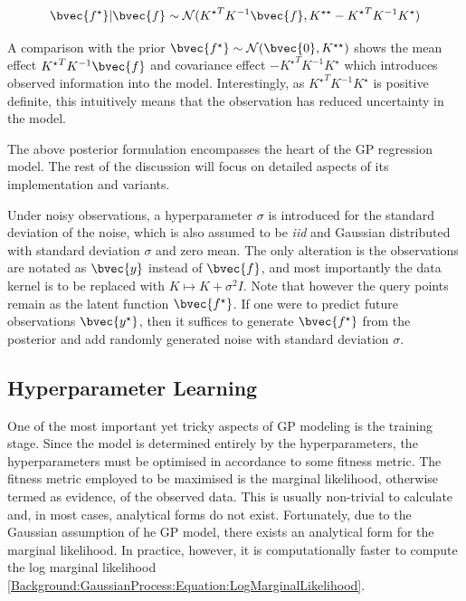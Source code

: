 		\begin{equation}
			\bvec{f^{\star}} | \bvec{f} \sim \mathcal{N}({K^{\star}}^{T} K^{-1} \bvec{f}, K^{\star \star} - {K^{\star}}^{T} K^{-1} K^{\star})
		\label{Background:GaussianProcess:Equation:ConditionalDistribution}
		\end{equation}						
		
		A comparison with the prior $\bvec{f^{\star}} \sim \mathcal{N}(\bvec{0}, K^{\star \star})$ shows the mean effect ${K^{\star}}^{T} K^{-1} \bvec{f}$ and covariance effect $- {K^{\star}}^{T} K^{-1} K^{\star}$ which introduces observed information into the model. Interestingly, as ${K^{\star}}^{T} K^{-1} K^{\star}$ is positive definite, this intuitively means that the observation has reduced uncertainty in the model.
		
		The above posterior formulation encompasses the heart of the GP regression model. The rest of the discussion will focus on detailed aspects of its implementation and variants.
		
		
		Under noisy observations, a hyperparameter $\sigma$ is introduced for the standard deviation of the noise, which is also assumed to be \textit{iid} and Gaussian distributed with standard deviation $\sigma$ and zero mean. The only alteration is the observations are notated as $\bvec{y}$ instead of $\bvec{f}$, and most importantly the data kernel is to be replaced with $K \mapsto K + \sigma^{2} I$. Note that however the query points remain as the latent function $\bvec{f^{\star}}$. If one were to predict future observations $\bvec{y^{\star}}$, then it suffices to generate $\bvec{f^{\star}}$ from the posterior and add randomly generated noise with standard deviation $\sigma$.
			
		\subsection{Hyperparameter Learning}
		
			One of the most important yet tricky aspects of GP modeling is the training stage. Since the model is determined entirely by the hyperparameters, the hyperparameters must be optimised in accordance to some fitness metric. The fitness metric employed to be maximised is the marginal likelihood, otherwise termed as evidence, of the observed data. This is usually non-trivial to calculate and, in most cases, analytical forms do not exist. Fortunately, due to the Gaussian assumption of he GP model, there exists an analytical form for the marginal likelihood. In practice, however, it is computationally faster to compute the log marginal likelihood \eqref{Background:GaussianProcess:Equation:LogMarginalLikelihood}.
			
